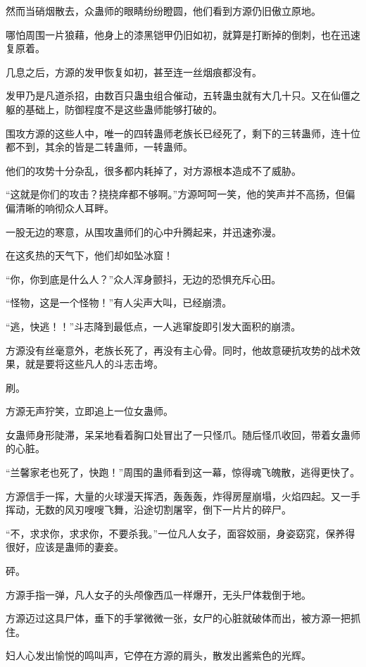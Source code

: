 \begin{this_body}
然而当硝烟散去，众蛊师的眼睛纷纷瞪圆，他们看到方源仍旧傲立原地。

哪怕周围一片狼藉，他身上的漆黑铠甲仍旧如初，就算是打断掉的倒刺，也在迅速复原着。

几息之后，方源的发甲恢复如初，甚至连一丝烟痕都没有。

发甲乃是凡道杀招，由数百只蛊虫组合催动，五转蛊虫就有大几十只。又在仙僵之躯的基础上，防御程度不是这些蛊师能够打破的。

围攻方源的这些人中，唯一的四转蛊师老族长已经死了，剩下的三转蛊师，连十位都不到，其余的皆是二转蛊师，一转蛊师。

他们的攻势十分杂乱，很多都内耗掉了，对方源根本造成不了威胁。

“这就是你们的攻击？挠挠痒都不够啊。”方源呵呵一笑，他的笑声并不高扬，但偏偏清晰的响彻众人耳畔。

一股无边的寒意，从围攻蛊师们的心中升腾起来，并迅速弥漫。

在这炙热的天气下，他们却如坠冰窟！

“你，你到底是什么人？”众人浑身颤抖，无边的恐惧充斥心田。

“怪物，这是一个怪物！”有人尖声大叫，已经崩溃。

“逃，快逃！！”斗志降到最低点，一人逃窜旋即引发大面积的崩溃。

方源没有丝毫意外，老族长死了，再没有主心骨。同时，他故意硬抗攻势的战术效果，就是要将这些凡人的斗志击垮。

刷。

方源无声狞笑，立即追上一位女蛊师。

女蛊师身形陡滞，呆呆地看着胸口处冒出了一只怪爪。随后怪爪收回，带着女蛊师的心脏。

“兰馨家老也死了，快跑！”周围的蛊师看到这一幕，惊得魂飞魄散，逃得更快了。

方源信手一挥，大量的火球漫天挥洒，轰轰轰，炸得房屋崩塌，火焰四起。又一手挥动，无数的风刃嗖嗖飞舞，沿途切割屠宰，倒下一片片的碎尸。

“不，求求你，求求你，不要杀我。”一位凡人女子，面容姣丽，身姿窈窕，保养得很好，应该是蛊师的妻妾。

砰。

方源手指一弹，凡人女子的头颅像西瓜一样爆开，无头尸体栽倒于地。

方源迈过这具尸体，垂下的手掌微微一张，女尸的心脏就破体而出，被方源一把抓住。

妇人心发出愉悦的鸣叫声，它停在方源的肩头，散发出酱紫色的光辉。


\end{this_body}
